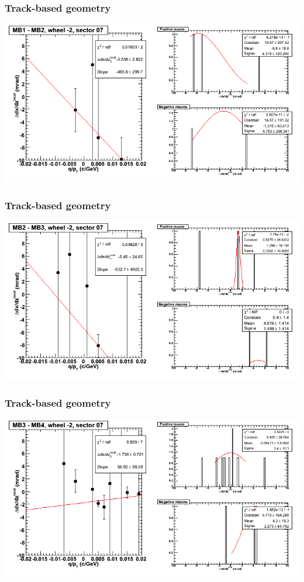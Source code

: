 \documentclass[compress]{beamer}
\begin{document}
\begin{frame}
\frametitle{Track-based geometry}
\includegraphics[width=\linewidth]{NOV4_segdiffs/dt13_slope_A_07_12.png}
\end{frame}

\begin{frame}
\frametitle{Track-based geometry}
\includegraphics[width=\linewidth]{NOV4_segdiffs/dt13_slope_A_07_23.png}
\end{frame}

\begin{frame}
\frametitle{Track-based geometry}
\includegraphics[width=\linewidth]{NOV4_segdiffs/dt13_slope_A_07_34.png}
\end{frame}
\end{document}
